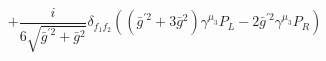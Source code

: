 %
\begin{dmath*}
%
  +  \frac{i}{6 \sqrt{{\bar g}^{\prime 2} + {\bar g}{}^2}}\delta_{f_1 f_2}  \left(\left({\bar g}^{\prime 2} + 3 {\bar g}{}^2\right) \gamma^{\mu_3} P_L - 2 {\bar g}^{\prime 2} \gamma^{\mu_3} P_R\right)
%
\end{dmath*}
%
